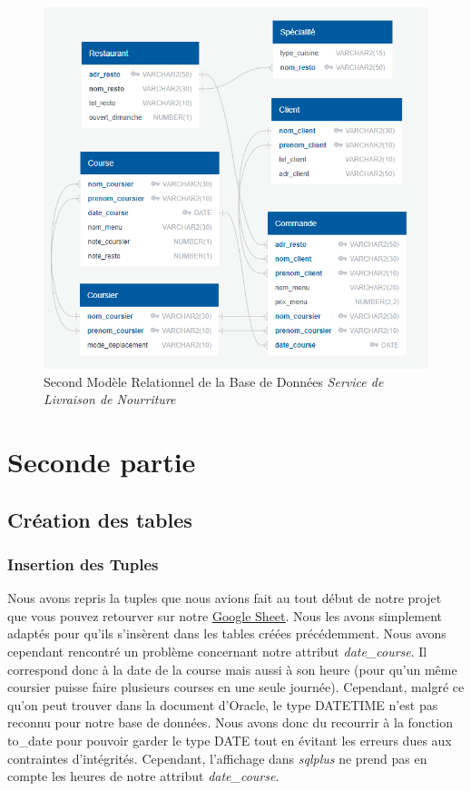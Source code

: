\documentclass[french]{article}
\begin{document}
        \begin{figure}[ht] %
            \centering
            \includegraphics[scale = 0.7]{Image/modele_relationnel_2.png}
            \caption{Second Modèle Relationnel de la Base de Données \emph{Service de Livraison de Nourriture}}
            \label{image_modele_relationnel_2}
        \end{figure}
        \newpage

\section{Seconde partie}
        \subsection*{Création des tables}

        \subsubsection*{Insertion des Tuples}
            Nous avons repris la tuples que nous avions fait au tout début de notre projet que vous pouvez retourver sur notre \href{https://docs.google.com/spreadsheets/d/1HeSNFvLN3-yMfWHoYLVumzOeQpHXJHynqVBusbvl6EQ/edit?usp=sharing}{\underline{Google Sheet}}. Nous les avons simplement adaptés pour qu'ils s'insèrent dans les tables créées précédemment.\newline
            Nous avons cependant rencontré un problème concernant notre attribut \textit{date\_course}. Il correspond donc à la date de la course mais aussi à son heure (pour qu'un même coursier puisse faire plusieurs courses en une seule journée). Cependant, malgré ce qu'on peut trouver dans la document d'Oracle, le type DATETIME n'est pas reconnu pour notre base de données. Nous avons donc du recourrir à la fonction to\_date pour pouvoir garder le type DATE tout en évitant les erreurs dues aux contraintes d'intégrités. Cependant, l'affichage dans \emph{sqlplus} ne prend pas en compte les heures de notre attribut \textit{date\_course}.
\end{document}
